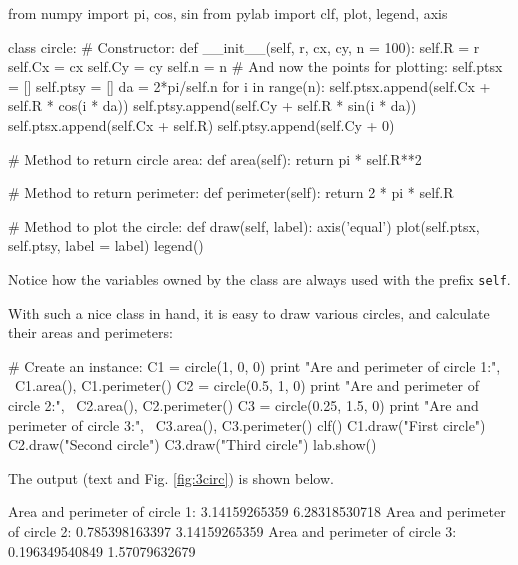 \begin{bluecode}
from numpy import pi, cos, sin
from pylab import clf, plot, legend, axis

class circle:
    # Constructor:
    def __init__(self, r, cx, cy, n = 100):
        self.R = r
        self.Cx = cx
        self.Cy = cy
        self.n = n
        # And now the points for plotting:
        self.ptsx = []
        self.ptsy = []
        da = 2*pi/self.n
        for i in range(n):
            self.ptsx.append(self.Cx + self.R * cos(i * da))
            self.ptsy.append(self.Cy + self.R * sin(i * da))
        self.ptsx.append(self.Cx + self.R)
        self.ptsy.append(self.Cy + 0)
            
    # Method to return circle area:
    def area(self):
        return pi * self.R**2
      
    # Method to return perimeter:
    def perimeter(self):
        return 2 * pi * self.R
      
    # Method to plot the circle:
    def draw(self, label):
        axis('equal')
        plot(self.ptsx, self.ptsy, label = label)
        legend()
\end{bluecode}
Notice how the variables owned by the class are always used with the 
prefix {\tt self}.

With such a nice class in hand, it is easy to draw various circles,
and calculate their areas and perimeters:
\begin{bluecode}        
# Create an instance:
C1 = circle(1, 0, 0)
print "Are and perimeter of circle 1:", \
C1.area(), C1.perimeter()
C2 = circle(0.5, 1, 0)
print "Are and perimeter of circle 2:", \
C2.area(), C2.perimeter()
C3 = circle(0.25, 1.5, 0)
print "Are and perimeter of circle 3:", \
C3.area(), C3.perimeter()
clf()
C1.draw("First circle")
C2.draw("Second circle")
C3.draw("Third circle")
lab.show()
\end{bluecode}
The output (text and Fig. \ref{fig:3circ}) is shown below.

\begin{greencode}
Area and perimeter of circle 1: 3.14159265359 6.28318530718
Area and perimeter of circle 2: 0.785398163397 3.14159265359
Area and perimeter of circle 3: 0.196349540849 1.57079632679
\end{greencode}

